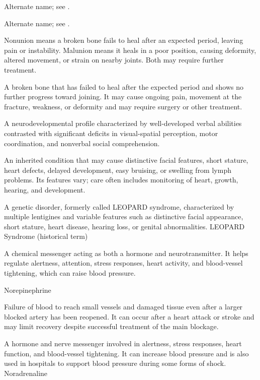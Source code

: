  Alternate name; see .

 Alternate name; see .

 Nonunion means a broken bone fails to heal after an expected period, leaving pain or instability. Malunion means it heals in a poor position, causing deformity, altered movement, or strain on nearby joints. Both may require further treatment.

 A broken bone that has failed to heal after the expected period and shows no further progress toward joining. It may cause ongoing pain, movement at the fracture, weakness, or deformity and may require surgery or other treatment.

 A neurodevelopmental profile characterized by well-developed verbal abilities contrasted with significant deficits in visual-spatial perception, motor coordination, and nonverbal social comprehension.

 An inherited condition that may cause distinctive facial features, short stature, heart defects, delayed development, easy bruising, or swelling from lymph problems. Its features vary; care often includes monitoring of heart, growth, hearing, and development.

 A genetic disorder, formerly called LEOPARD syndrome, characterized by multiple lentigines and variable features such as distinctive facial appearance, short stature, heart disease, hearing loss, or genital abnormalities.
\synonyms
LEOPARD Syndrome (historical term)

 A chemical messenger acting as both a hormone and neurotransmitter. It helps regulate alertness, attention, stress responses, heart activity, and blood-vessel tightening, which can raise blood pressure.

\synonyms
Norepinephrine

 Failure of blood to reach small vessels and damaged tissue even after a larger blocked artery has been reopened. It can occur after a heart attack or stroke and may limit recovery despite successful treatment of the main blockage.

 A hormone and nerve messenger involved in alertness, stress responses, heart function, and blood-vessel tightening. It can increase blood pressure and is also used in hospitals to support blood pressure during some forms of shock.
\synonyms
Noradrenaline

